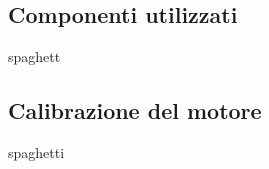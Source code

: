 \appendix

\subsection{Componenti utilizzati}\label{subsec:componenti-utilizzati}
spaghett

\subsection{Calibrazione del motore}\label{subsec:calibrazione-motore}
spaghetti
